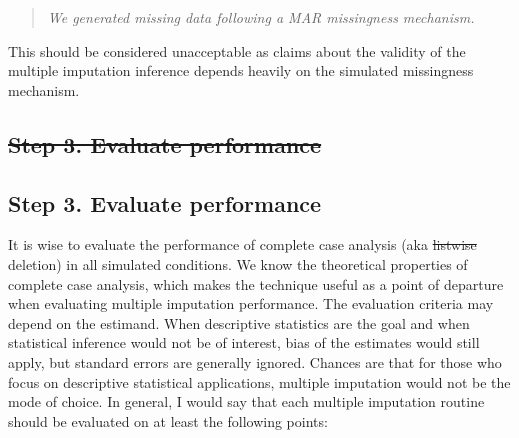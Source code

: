 \documentclass[ %
]{article} %
\providecommand{\DIFaddtex}[1]{{\protect\color{blue}\uwave{#1}}} %
\providecommand{\DIFdeltex}[1]{{\protect\color{red}\sout{#1}}}                      %
\providecommand{\DIFaddbegin}{} %
\providecommand{\DIFaddend}{} %
\providecommand{\DIFdelbegin}{} %
\providecommand{\DIFdelend}{} %
\providecommand{\DIFadd}[1]{\texorpdfstring{\DIFaddtex{#1}}{#1}} %
\providecommand{\DIFdel}[1]{\texorpdfstring{\DIFdeltex{#1}}{}} %
\newcommand{\DIFscaledelfig}{0.5}
\newlength{\DIFdelgraphicswidth} %
\newlength{\DIFdelgraphicsheight} %
\newcommand{\DIFaddincludegraphics}[2][]{{\color{blue}\fbox{\DIFOincludegraphics[#1]{#2}}}} %
\newcommand{\DIFdelincludegraphics}[2][]{%
\sbox{\DIFdelgraphicsbox}{\DIFOincludegraphics[#1]{#2}}%
\settoboxwidth{\DIFdelgraphicswidth}{\DIFdelgraphicsbox} %
\settoboxtotalheight{\DIFdelgraphicsheight}{\DIFdelgraphicsbox} %
\scalebox{\DIFscaledelfig}{%
\parbox[b]{\DIFdelgraphicswidth}{\usebox{\DIFdelgraphicsbox}\\[-\baselineskip] \rule{\DIFdelgraphicswidth}{0em}}\llap{\resizebox{\DIFdelgraphicswidth}{\DIFdelgraphicsheight}{%
\setlength{\unitlength}{\DIFdelgraphicswidth}%
\begin{picture}(1,1)%
\thicklines\linethickness{2pt} %
{\color[rgb]{1,0,0}\put(0,0){\framebox(1,1){}}}%
{\color[rgb]{1,0,0}\put(0,0){\line( 1,1){1}}}%
{\color[rgb]{1,0,0}\put(0,1){\line(1,-1){1}}}%
\end{picture}%
}\hspace*{3pt}}} %
} %
\DeclareRobustCommand{\DIFaddbegin}{\DIFOaddbegin \let\includegraphics\DIFaddincludegraphics} %
\DeclareRobustCommand{\DIFaddend}{\DIFOaddend \let\includegraphics\DIFOincludegraphics} %
\DeclareRobustCommand{\DIFdelbegin}{\DIFOdelbegin \let\includegraphics\DIFdelincludegraphics} %
\DeclareRobustCommand{\DIFdelend}{\DIFOaddend \let\includegraphics\DIFOincludegraphics} %
\begin{document}
\DIFaddend \begin{quote}
\emph{We generated missing data following a MAR missingness mechanism.}
\end{quote}
\DIFaddbegin 

\DIFaddend This should be considered unacceptable as claims about the validity of
the multiple imputation inference depends heavily on the simulated
missingness mechanism.

\DIFdelbegin \subsection*{\DIFdel{Step 3. Evaluate performance}}
\DIFdelend \DIFaddbegin \hypertarget{step-3.-evaluate-performance}{%
\subsection{Step 3. Evaluate
performance}\label{step-3.-evaluate-performance}}

\DIFaddend It is wise to evaluate the performance of complete case analysis (aka
\DIFdelbegin \DIFdel{listwise }\DIFdelend \DIFaddbegin \DIFadd{list-wise }\DIFaddend deletion) in all simulated conditions. We know the theoretical
properties of complete case analysis, which makes the technique useful
as a point of departure when evaluating multiple imputation performance.
The evaluation criteria may depend on the estimand. When descriptive
statistics are the goal and when statistical inference would not be of
interest, bias of the estimates would still apply, but standard errors
are generally ignored. Chances are that for those who focus on
descriptive statistical applications, multiple imputation would not be
the mode of choice. In general, I would say that each multiple
imputation routine should be evaluated on at least the following points:
\DIFaddbegin 
\end{document}
